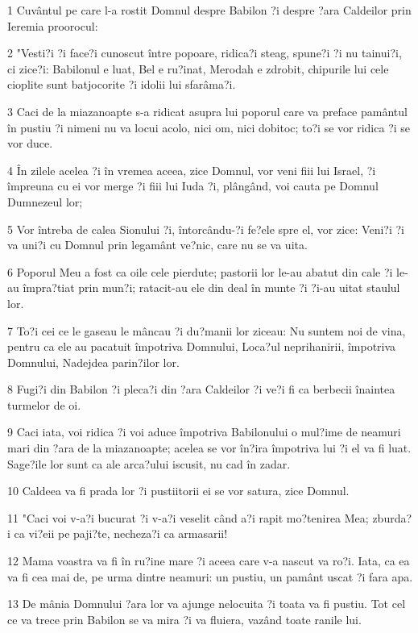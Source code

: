 \par 1 Cuvântul pe care l-a rostit Domnul despre Babilon ?i despre ?ara Caldeilor prin Ieremia proorocul:
\par 2 "Vesti?i ?i face?i cunoscut între popoare, ridica?i steag, spune?i ?i nu tainui?i, ci zice?i: Babilonul e luat, Bel e ru?inat, Merodah e zdrobit, chipurile lui cele cioplite sunt batjocorite ?i idolii lui sfarâma?i.
\par 3 Caci de la miazanoapte s-a ridicat asupra lui poporul care va preface pamântul în pustiu ?i nimeni nu va locui acolo, nici om, nici dobitoc; to?i se vor ridica ?i se vor duce.
\par 4 În zilele acelea ?i în vremea aceea, zice Domnul, vor veni fiii lui Israel, ?i împreuna cu ei vor merge ?i fiii lui Iuda ?i, plângând, voi cauta pe Domnul Dumnezeul lor;
\par 5 Vor întreba de calea Sionului ?i, întorcându-?i fe?ele spre el, vor zice: Veni?i ?i va uni?i cu Domnul prin legamânt ve?nic, care nu se va uita.
\par 6 Poporul Meu a fost ca oile cele pierdute; pastorii lor le-au abatut din cale ?i le-au împra?tiat prin mun?i; ratacit-au ele din deal în munte ?i ?i-au uitat staulul lor.
\par 7 To?i cei ce le gaseau le mâncau ?i du?manii lor ziceau: Nu suntem noi de vina, pentru ca ele au pacatuit împotriva Domnului, Loca?ul neprihanirii, împotriva Domnului, Nadejdea parin?ilor lor.
\par 8 Fugi?i din Babilon ?i pleca?i din ?ara Caldeilor ?i ve?i fi ca berbecii înaintea turmelor de oi.
\par 9 Caci iata, voi ridica ?i voi aduce împotriva Babilonului o mul?ime de neamuri mari din ?ara de la miazanoapte; acelea se vor în?ira împotriva lui ?i el va fi luat. Sage?ile lor sunt ca ale arca?ului iscusit, nu cad în zadar.
\par 10 Caldeea va fi prada lor ?i pustiitorii ei se vor satura, zice Domnul.
\par 11 "Caci voi v-a?i bucurat ?i v-a?i veselit când a?i rapit mo?tenirea Mea; zburda?i ca vi?eii pe paji?te, necheza?i ca armasarii!
\par 12 Mama voastra va fi în ru?ine mare ?i aceea care v-a nascut va ro?i. Iata, ca ea va fi cea mai de, pe urma dintre neamuri: un pustiu, un pamânt uscat ?i fara apa.
\par 13 De mânia Domnului ?ara lor va ajunge nelocuita ?i toata va fi pustiu. Tot cel ce va trece prin Babilon se va mira ?i va fluiera, vazând toate ranile lui.
